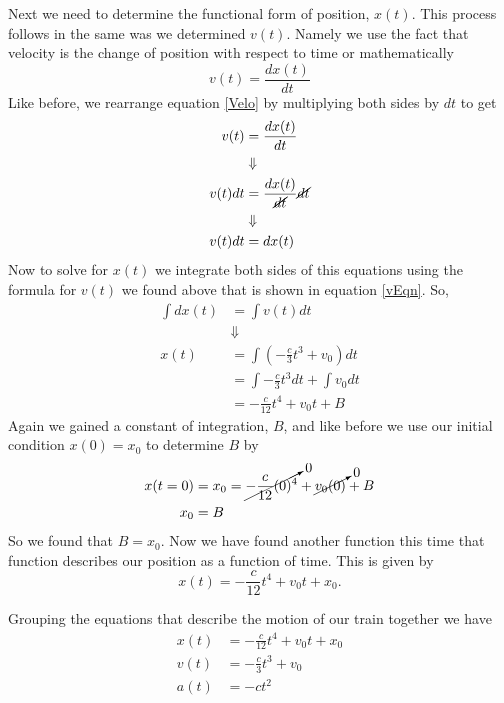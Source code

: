 \documentclass[11pt]{article}
\begin{document}
Next we need to determine the functional form of position, $x(t)$. This process follows in 
the same was we determined $v(t)$. Namely we use the fact that velocity is the change of 
position with respect to time or mathematically
\begin{equation}
v(t) = \frac{dx(t)}{dt}
\label{Velo}
\end{equation}
Like before, we rearrange equation \ref{Velo} by multiplying both sides by $dt$ to get
\begin{align*}
v(t) &= \frac{dx(t)}{dt}\\
&\Downarrow\\
v(t)dt &= \frac{dx(t)}{\cancel{dt}}\cancel{dt}\\
&\Downarrow\\
v(t)dt &= dx(t)
\end{align*}
Now to solve for $x(t)$ we integrate both sides of this equations using the formula for 
$v(t)$ we found above that is shown in equation \ref{vEqn}. So,
\begin{align*}
\int dx(t) &= \int v(t)dt \\
&\Downarrow\\
x(t) &= \int\left(-\frac{c}{3}t^3 + v_0\right)dt\\
&= \int-\frac{c}{3}t^3dt + \int v_0dt\\
&= -\frac{c}{12}t^4 + v_0t + B
\end{align*}
Again we gained a constant of integration, $B$, and like before we use our initial condition
$x(0) = x_0$ to determine $B$ by
\begin{align*}
x(t=0) &= x_0 = \cancelto{0}{-\frac{c}{12}(0)^4} + \cancelto{0}{v_0(0)} + B\\
x_0 &= B
\end{align*}
So we found that $B=x_0$. Now we have found another function this time that function 
describes our position as a function of time. This is given by
\begin{equation}
x(t) = -\frac{c}{12}t^4 + v_0t + x_0.
\label{xEqn}
\end{equation}

Grouping the equations that describe the motion of our train together we have
\begin{align*}
x(t) &= -\frac{c}{12}t^4 + v_0t + x_0\\
v(t) &= -\frac{c}{3}t^3 + v_0\\
a(t) &= -ct^2
\end{align*}
\end{document}
